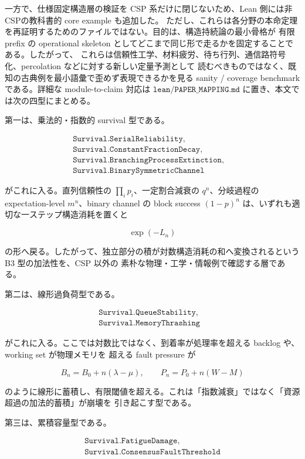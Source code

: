 \documentclass[12pt,a4paper]{article}
\begin{document}
一方で、仕様固定構造層の検証を CSP 系だけに閉じないため、Lean 側には非CSPの教科書的 core example も追加した。 ただし、これらは各分野の本命定理を再証明するためのファイルではない。目的は、構造持続論の最小骨格が 有限 prefix の operational skeleton としてどこまで同じ形で走るかを固定することである。したがって、 これらは信頼性工学、材料疲労、待ち行列、通信路符号化、percolation などに対する新しい定量予測として 読むべきものではなく、既知の古典例を最小語彙で歪めず表現できるかを見る sanity / coverage benchmark である。詳細な module-to-claim 対応は \(\texttt{lean/PAPER\_MAPPING.md}\) に置き、本文では次の四型にまとめる。

第一は、乗法的・指数的 survival 型である。

\[
\begin{aligned}
\texttt{Survival.SerialReliability},\quad \\
\texttt{Survival.ConstantFractionDecay},\quad \\
\texttt{Survival.BranchingProcessExtinction},\quad \\
\texttt{Survival.BinarySymmetricChannel}
\end{aligned}
\]

がこれに入る。直列信頼性の \(\prod_{i} p_{i}\)、一定割合減衰の \(q^n\)、分岐過程の expectation-level \(m^n\)、binary channel の block success \((1-p)^n\) は、いずれも適切な一ステップ構造消耗を置くと

\[
\exp(-L_{n})
\]

の形へ戻る。したがって、独立部分の積が対数構造消耗の和へ変換されるという B3 型の加法性を、CSP 以外の 素朴な物理・工学・情報例で確認する層である。

第二は、線形過負荷型である。

\[
\begin{aligned}
\texttt{Survival.QueueStability},\quad \\
\texttt{Survival.MemoryThrashing}
\end{aligned}
\]

がこれに入る。ここでは対数比ではなく、到着率が処理率を超える backlog や、working set が物理メモリを 超える fault pressure が

\[
B_{n}=B_0+n(\lambda-\mu),\qquad P_{n}=P_0+n(W-M)
\]

のように線形に蓄積し、有限閾値を超える。これは「指数減衰」ではなく「資源超過の加法的蓄積」が崩壊を 引き起こす型である。

第三は、累積容量型である。

\[
\begin{aligned}
\texttt{Survival.FatigueDamage},\quad \\
\texttt{Survival.ConsensusFaultThreshold}
\end{aligned}
\]
\end{document}
